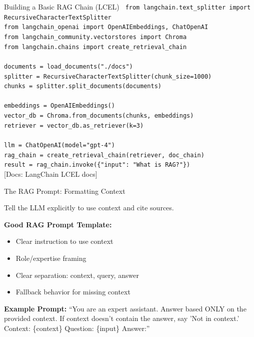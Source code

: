 \documentclass[aspectratio=169,11pt]{beamer}
\newcommand{\docref}[1]{{\scriptsize\color{docgray}[Docs: #1]}}
\begin{document}
\begin{frame}[fragile]{Building a Basic RAG Chain (LCEL)}
  \fontsize{7}{8}\selectfont
  \texttt{
  from langchain.text\_splitter import RecursiveCharacterTextSplitter \\
  from langchain\_openai import OpenAIEmbeddings, ChatOpenAI \\
  from langchain\_community.vectorstores import Chroma \\
  from langchain.chains import create\_retrieval\_chain \\
  \\
  documents = load\_documents("./docs") \\
  splitter = RecursiveCharacterTextSplitter(chunk\_size=1000) \\
  chunks = splitter.split\_documents(documents) \\
  \\
  embeddings = OpenAIEmbeddings() \\
  vector\_db = Chroma.from\_documents(chunks, embeddings) \\
  retriever = vector\_db.as\_retriever(k=3) \\
  \\
  llm = ChatOpenAI(model="gpt-4") \\
  rag\_chain = create\_retrieval\_chain(retriever, doc\_chain) \\
  result = rag\_chain.invoke(\{"input": "What is RAG?"\}) \\
  }
  \normalsize
  \vspace{0.08cm}
  \docref{LangChain LCEL docs}
\end{frame}

\begin{frame}{The RAG Prompt: Formatting Context}
  \begin{tipbox}
    Tell the LLM explicitly to use context and cite sources.
  \end{tipbox}

  \textbf{Good RAG Prompt Template:}
  \begin{itemize}
    \setlength{\itemsep}{1pt}
    \item Clear instruction to use context
    \item Role/expertise framing
    \item Clear separation: context, query, answer
    \item Fallback behavior for missing context
  \end{itemize}

  \textbf{Example Prompt:}
  ``You are an expert assistant. Answer based ONLY on the provided context. If context doesn't contain the answer, say 'Not in context.' Context: \{context\} Question: \{input\} Answer:''
\end{frame}
\end{document}
